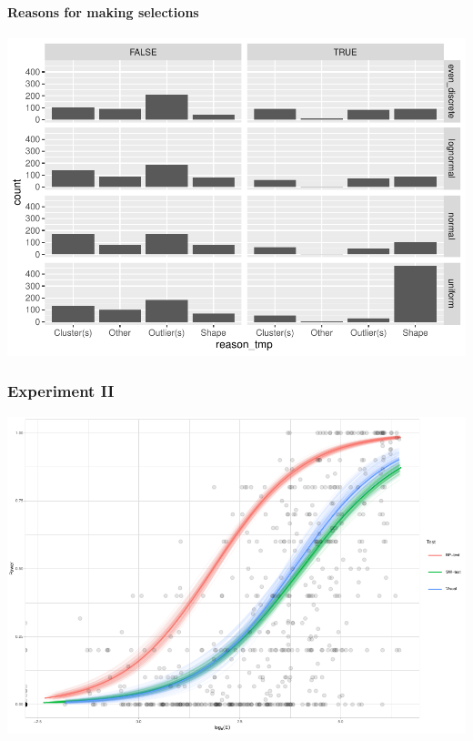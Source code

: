 \documentclass[]{interact}
\theoremstyle{plain}%
\theoremstyle{definition}
\theoremstyle{remark}
\begin{document}
\hypertarget{reasons-for-making-selections}{%
\paragraph{Reasons for making
selections}\label{reasons-for-making-selections}}

\includegraphics{paper_comparison_files/figure-latex/unnamed-chunk-12-1.pdf}

\hypertarget{experiment-ii}{%
\subsubsection{Experiment II}\label{experiment-ii}}

\includegraphics{paper_comparison_files/figure-latex/unnamed-chunk-15-1.pdf}
\end{document}
